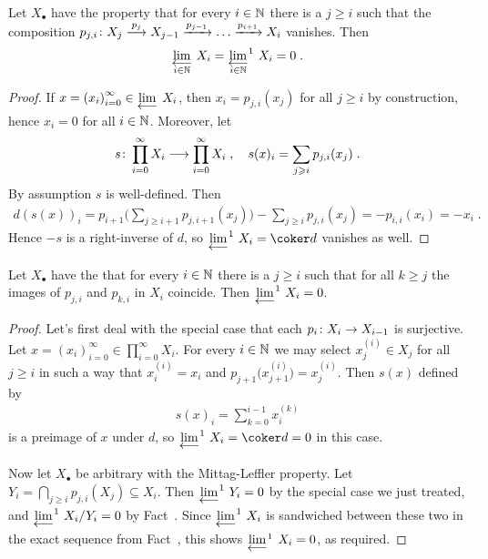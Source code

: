 \documentclass[a4paper,parskip=half,numbers=enddot, DIV=12]{scrreprt}
\renewcommand{\geq}{\geqslant}
\begin{document}
\begin{fact}
	Let $X_\bullet$ have the property that for every $i\in\mathbb{N}$ there is a $j\geq i$ such that the composition $p_{j,i}\colon X_j\morphism[p_j]X_{j-1}\xrightarrow{p_{j-1}}\ldots\xrightarrow{p_{i+1}}X_i$ vanishes. Then
	\begin{align*}
		\limit[i\in\IN]X_i=\limit[i\in\IN][^1]X_i=0\;.
	\end{align*}
\end{fact}
\begin{proof}
	If $x=\left(x_i\right)_{i=0}^\infty\in\limit X_i$, then $x_i=p_{j,i}(x_j)$ for all $j\geq i$ by construction, hence $x_i=0$ for all $i\in\mathbb{N}$. Moreover, let
	\begin{align*}
		s\colon \prod_{i=0}^{\infty}X_i\morphism\prod_{i=0}^\infty X_i\;,\quad s(x)_i=\sum_{j\geq i}p_{j,i}(x_j)\;.
	\end{align*}
	By assumption $s$ is well-defined. Then
	\begin{align*}
		d(s(x))_i=p_{i+1}\bigg(\sum_{j\geq i+1}p_{j,i+1}(x_j)\bigg)-\sum_{j\geq i}p_{j,i}(x_j)=-p_{i,i}(x_i)=-x_i\;.
	\end{align*}
	Hence $-s$ is a right-inverse of $d$, so $\limit[][^1]X_i=\coker d$ vanishes as well.
\end{proof}
\begin{fact}
	Let $X_\bullet$ have the  that for every $i\in\mathbb{N}$ there is a $j\geq i$ such that for all $k\geq j$ the images of $p_{j,i}$ and $p_{k,i}$ in $X_i$ coincide. Then $\limit[][^1]X_i=0$.
\end{fact}
\begin{proof}
	Let's first deal with the special case that each $p_i\colon X_i\morphism X_{i-1}$ is surjective. Let $x=\left(x_i\right)_{i=0}^\infty\in\prod_{i=0}^\infty X_i$. For every $i\in\mathbb{N}$ we may select $x_j^{(i)}\in X_j$ for all $j\geq i$ in such a way that $x_i^{(i)}=x_i$ and $p_{j+1}\big(x_{j+1}^{(i)}\big)=x_j^{(i)}$. Then $s(x)$ defined by
	\begin{align*}
		s(x)_i=\sum_{k=0}^{i-1}x_i^{(k)}
	\end{align*}
	is a preimage of $x$ under $d$, so $\limit[][^1]X_i=\coker d=0$ in this case.
	
	Now let $X_\bullet$ be arbitrary with the Mittag-Leffler property. Let $Y_i=\bigcap_{j\geq i}p_{j,i}(X_j)\subseteq X_i$. Then $\limit[][^1]Y_i=0$ by the special case we just treated, and $\limit[][^1]X_i/Y_i=0$ by Fact~. Since $\limit[][^1]X_i$ is sandwiched between these two in the exact sequence from Fact~, this shows $\limit[][\smash{^1}]X_i=0$, as required.
\end{proof}
\end{document}
